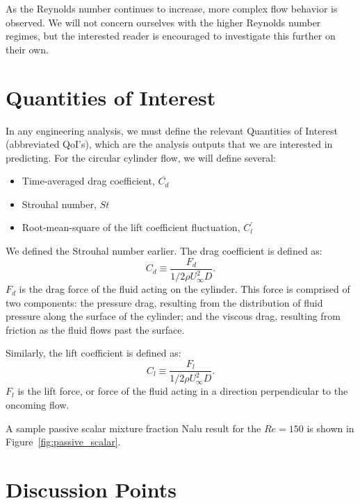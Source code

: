 \documentclass{article}
\begin{document}
As the Reynolds number continues to increase, more complex flow
behavior is observed.  We will not concern ourselves with the higher
Reynolds number regimes, but the interested reader is encouraged to
investigate this further on their own.

\section*{Quantities of Interest}
In any engineering analysis, we must define the relevant Quantities
of Interest (abbreviated QoI's), which are the analysis outputs that
we are interested in predicting. For the circular cylinder flow, we will
define several:
\begin{itemize}
  \item Time-averaged drag coefficient, $\overline{C_d}$
  \item Strouhal number, $St$
  \item Root-mean-square of the lift coefficient fluctuation,
    $C^\prime_l$
\end{itemize}

We defined the Strouhal number earlier.  The drag coefficient is
defined as:
\begin{equation}
  C_d \equiv \frac{F_d}{1/2 \rho U_\infty^2 D}.
\end{equation}
$F_d$ is the drag force of the fluid acting on the cylinder.  This
force is comprised of two components: the pressure drag, resulting
from the distribution of fluid pressure along the surface of the
cylinder; and the viscous drag, resulting from friction as the fluid
flows past the surface.

Similarly, the lift coefficient is defined as:
\begin{equation}
  C_l \equiv \frac{F_l}{1/2 \rho U_\infty^2 D}.
\end{equation}
$F_l$ is the lift force, or force of the fluid acting in a direction
perpendicular to the oncoming flow.


A sample passive scalar mixture fraction Nalu result for the $Re = 150$ is shown in Figure~\ref{fig:passive_scalar}.

\section{Discussion Points}
\end{document}
